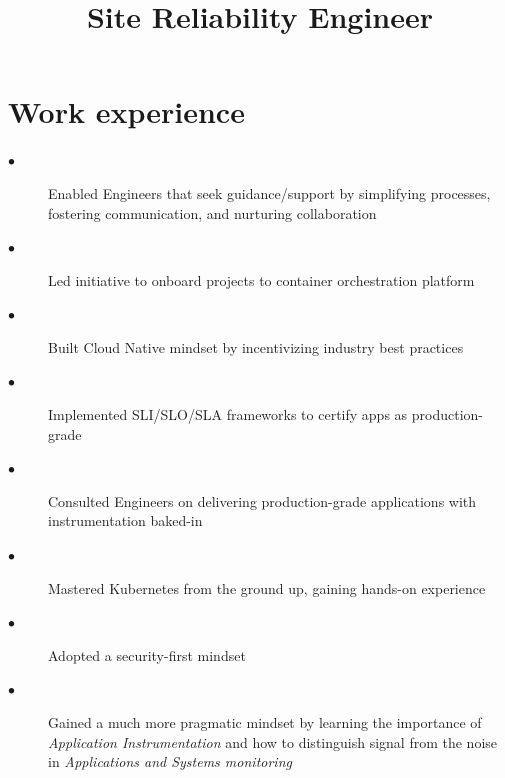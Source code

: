 \documentclass[11pt,a4paper,Hack,english]{moderncv}        %
\title{Site Reliability Engineer}%
\begin{document}
\makecvtitle
\section{Work experience}
{
	\begin{description}
		\item[$\bullet$] Enabled Engineers that seek guidance/support by
                     simplifying processes, fostering communication, and
                     nurturing collaboration
		\item[$\bullet$] Led initiative to onboard projects to container orchestration platform
		\item[$\bullet$] Built Cloud Native mindset by incentivizing industry best practices
		\item[$\bullet$] Implemented SLI/SLO/SLA frameworks to certify apps as production-grade
		\item[$\bullet$] Consulted Engineers on delivering production-grade applications with instrumentation baked-in
	\end{description}
}

{
	\begin{description}
    \item[$\bullet$] Mastered Kubernetes from the ground up, gaining hands-on experience
    \item[$\bullet$] Adopted a security-first mindset
    \item[$\bullet$] Gained a much more pragmatic mindset by learning the importance of \textit{Application Instrumentation}
                     and how to distinguish signal from the noise in \textit{Applications and Systems monitoring}
	\end{description}
}
\end{document}
